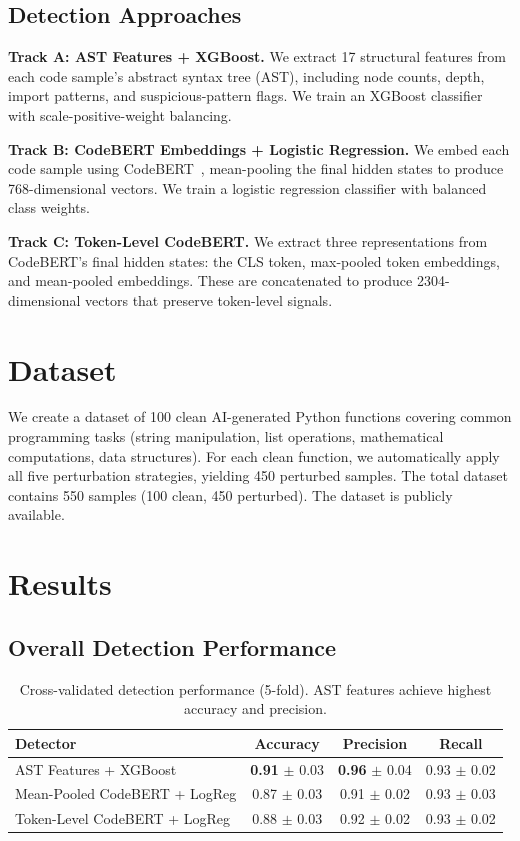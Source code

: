 \documentclass[11pt]{article}
\begin{document}
\subsection{Detection Approaches}
\label{sec:detectors}

\textbf{Track A: AST Features + XGBoost.} We extract 17 structural features from each code sample's abstract syntax tree (AST), including node counts, depth, import patterns, and suspicious-pattern flags. We train an XGBoost classifier with scale-positive-weight balancing.

\textbf{Track B: CodeBERT Embeddings + Logistic Regression.} We embed each code sample using CodeBERT~\cite{feng2020codebert}, mean-pooling the final hidden states to produce 768-dimensional vectors. We train a logistic regression classifier with balanced class weights.

\textbf{Track C: Token-Level CodeBERT.} We extract three representations from CodeBERT's final hidden states: the CLS token, max-pooled token embeddings, and mean-pooled embeddings. These are concatenated to produce 2304-dimensional vectors that preserve token-level signals.

\section{Dataset}
\label{sec:dataset}

We create a dataset of 100 clean AI-generated Python functions covering common programming tasks (string manipulation, list operations, mathematical computations, data structures). For each clean function, we automatically apply all five perturbation strategies, yielding 450 perturbed samples. The total dataset contains 550 samples (100 clean, 450 perturbed). The dataset is publicly available.

\section{Results}
\label{sec:results}

\subsection{Overall Detection Performance}

\begin{table}[h]
\centering
\begin{tabular}{@{}lccc@{}}
\toprule
Detector & Accuracy & Precision & Recall \\
\midrule
AST Features + XGBoost & \textbf{0.91} $\pm$ 0.03 & \textbf{0.96} $\pm$ 0.04 & 0.93 $\pm$ 0.02 \\
Mean-Pooled CodeBERT + LogReg & 0.87 $\pm$ 0.03 & 0.91 $\pm$ 0.02 & 0.93 $\pm$ 0.03 \\
Token-Level CodeBERT + LogReg & 0.88 $\pm$ 0.03 & 0.92 $\pm$ 0.02 & 0.93 $\pm$ 0.02 \\
\bottomrule
\end{tabular}
\caption{Cross-validated detection performance (5-fold). AST features achieve highest accuracy and precision.}
\label{tab:overall}
\end{table}
\end{document}
